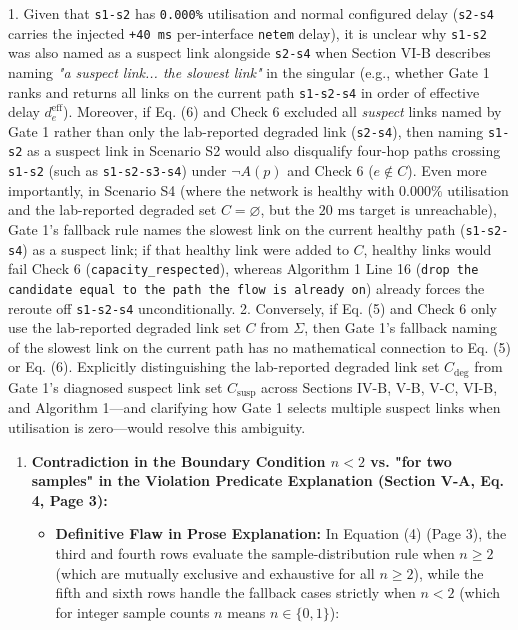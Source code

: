 \documentclass[11pt,a4paper]{article}
\begin{document}
1. Given that \texttt{s1-s2} has \texttt{0.000\%} utilisation and normal configured delay (\texttt{s2-s4} carries the injected \texttt{+40 ms} per-interface \texttt{netem} delay), it is unclear why \texttt{s1-s2} was also named as a suspect link alongside \texttt{s2-s4} when Section VI-B describes naming \emph{"a suspect link... the slowest link"} in the singular (e.g., whether Gate 1 ranks and returns all links on the current path \texttt{s1-s2-s4} in order of effective delay $d_e^{\text{eff}}$). Moreover, if Eq. (6) and Check 6 excluded all \emph{suspect} links named by Gate 1 rather than only the lab-reported degraded link (\texttt{s2-s4}), then naming \texttt{s1-s2} as a suspect link in Scenario S2 would also disqualify four-hop paths crossing \texttt{s1-s2} (such as \texttt{s1-s2-s3-s4}) under $\neg A(p)$ and Check 6 ($e \notin C$). Even more importantly, in Scenario S4 (where the network is healthy with $0.000\%$ utilisation and the lab-reported degraded set $C = \varnothing$, but the $20\text{ ms}$ target is unreachable), Gate 1's fallback rule names the slowest link on the current healthy path (\texttt{s1-s2-s4}) as a suspect link; if that healthy link were added to $C$, healthy links would fail Check 6 (\texttt{capacity\_respected}), whereas Algorithm 1 Line 16 (\texttt{drop the candidate equal to the path the flow is already on}) already forces the reroute off \texttt{s1-s2-s4} unconditionally.
2. Conversely, if Eq. (5) and Check 6 only use the lab-reported degraded link set $C$ from $\Sigma$, then Gate 1's fallback naming of the slowest link on the current path has no mathematical connection to Eq. (5) or Eq. (6). Explicitly distinguishing the lab-reported degraded link set $C_{\text{deg}}$ from Gate 1's diagnosed suspect link set $C_{\text{susp}}$ across Sections IV-B, V-B, V-C, VI-B, and Algorithm 1—and clarifying how Gate 1 selects multiple suspect links when utilisation is zero—would resolve this ambiguity.
\begin{enumerate}[leftmargin=1.6em,itemsep=3pt]
\item \textbf{Contradiction in the Boundary Condition $n < 2$ vs. "for two samples" in the Violation Predicate Explanation (Section V-A, Eq. 4, Page 3):}
\begin{itemize}[leftmargin=1.8em,itemsep=2pt]
\item \textbf{Definitive Flaw in Prose Explanation:} In Equation (4) (Page 3), the third and fourth rows evaluate the sample-distribution rule when $n \ge 2$ (which are mutually exclusive and exhaustive for all $n \ge 2$), while the fifth and sixth rows handle the fallback cases strictly when $n < 2$ (which for integer sample counts $n$ means $n \in \{0, 1\}$):
\end{itemize}
\end{enumerate}
\end{document}
